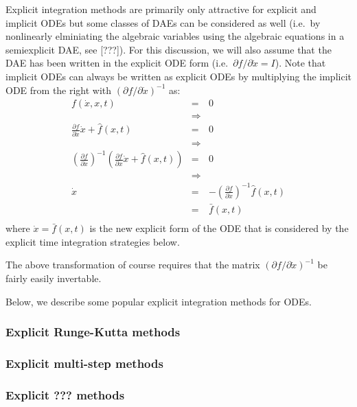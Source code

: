 \documentclass[pdf,ps2pdf,11pt]{SANDreport}
\begin{document}
Explicit integration methods are primarily only attractive for explicit and
implicit ODEs but some classes of DAEs can be considered as well (i.e.\ by
nonlinearly elminiating the algebraic variables using the algebraic equations
in a semiexplicit DAE, see [???]).  For this discussion, we will also assume
that the DAE has been written in the explicit ODE form (i.e.\ ${}\partial f /
{}\partial {}\dot{x} = I$).  Note that implicit ODEs can always be written as
explicit ODEs by multiplying the implicit ODE from the right with $({}\partial
f / {}\partial {}\dot{x})^{-1}$ as:
%
\begin{eqnarray*}
f(\dot{x},x,t) & = & 0 \\
& \Rightarrow \\
\frac{\partial f}{\partial \dot{x}} \dot{x} + \hat{f}(x,t) & = & 0 \\
& \Rightarrow \\
\left( \frac{\partial f}{\partial \dot{x}} \right)^{-1}
\left( \frac{\partial f}{\partial \dot{x}} \dot{x} + \hat{f}(x,t) \right) & = & 0 \\
& \Rightarrow \\
\dot{x} & = & -\left( \frac{\partial f}{\partial \dot{x}} \right)^{-1} \hat{f}(x,t) \\
& = & \bar{f}(x,t) \\
\end{eqnarray*}
%
where ${}\dot{x} = \bar{f}(x,t)$ is the new explicit form of the ODE that is
considered by the explicit time integration strategies below.

The above transformation of course requires that the matrix $({}\partial f /
{}\partial {}\dot{x})^{-1}$ be fairly easily invertable.

Below, we describe some popular explicit integration methods for ODEs.

\subsubsection{Explicit Runge-Kutta methods}

\subsubsection{Explicit multi-step methods}

\subsubsection{Explicit ??? methods}
\end{document}
